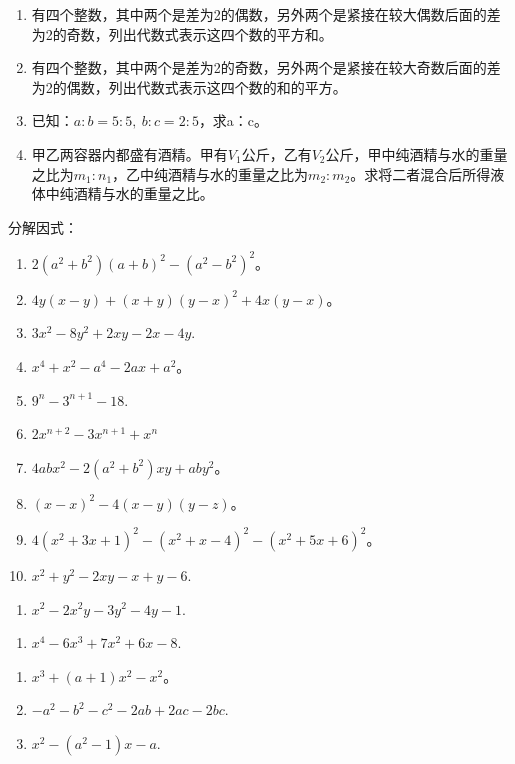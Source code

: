 \begin{enumerate}
\item
  有四个整数，其中两个是差为2的偶数，另外两个是紧接在较大偶数后面的差为2的奇数，列出代数式表示这四个数的平方和。
\item
  有四个整数，其中两个是差为2的奇数，另外两个是紧接在较大奇数后面的差为2的偶数，列出代数式表示这四个数的和的平方。
\item
  已知：\(a:b=5:5,\ b:c=2:5\)，求a：c。
\item
  甲乙两容器内都盛有酒精。甲有\(V_{1}\)公斤，乙有\(V_{2}\)公斤，甲中纯酒精与水的重量之比为\(m_{1}: n_{1}\)，乙中纯酒精与水的重量之比为\(m_{2}: m_{2}\)。求将二者混合后所得液体中纯酒精与水的重量之比。
\end{enumerate}

分解因式：

\begin{enumerate}[start=16]
\item
  \(2(a^{2} + b^{2})(a + b)^{2} - (a^{2} - b^{2})^{2}\)。
\item
  \(4y(x - y) + (x + y)(y - x)^{2} + 4x(y - x)\)。
\item
  \(3x^{2} - 8y^{2} + 2xy - 2x - 4y.\)
\item
  \(x^{4} + x^{2} - a^{4} - 2ax + a^{2}\)。
\item
  \(9^{n} - 3^{n + 1} - 18.\)
\item
  \(2x^{n + 2} - 3x^{n + 1} + x^n\)
\item
  \(4abx^{2} - 2(a^{2} + b^{2})xy + aby^{2}\)。
\item
  \((x - x)^{2} - 4(x - y)(y - z)\)。
\item
  \(4(x^{2} + 3x + 1)^{2} - (x^{2} + x - 4)^{2} - (x^{2} + 5x + 6)^{2}\)。
\item
  \(x^{2} + y^{2} - 2xy - x + y - 6.\)
\end{enumerate}

\begin{enumerate}[start=23]
\item
  \(x^{2} - 2x^{2}y - 3y^{2} - 4y - 1.\)
\end{enumerate}

\begin{enumerate}[start=27]
\item
  \(x^{4} - 6x^{3} + 7x^{2} + 6x - 8.\)
\end{enumerate}

\begin{enumerate}[start=28]
\item
  \(x^{3} + (a + 1)x^{2} - x^{2}\)。
\item
  \(-a^{2} - b^{2} - c^{2} - 2a b + 2a c - 2b c.\)
\item
  \(x^{2} - (a^{2} - 1)x - a.\)
\end{enumerate}

